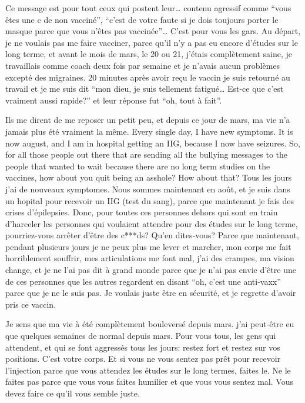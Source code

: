 Ce message est pour tout ceux qui postent leur… contenu agressif comme “vous
êtes une c de non vacciné”, “c'est de votre faute si je dois toujours porter le
masque parce que vous n'êtes pas vaccinée”… C'est pour vous les gars. Au départ,
je ne voulais pas me faire vacciner, parce qu'il n'y a pas eu encore d'études
sur le long terme, et avant le mois de mars, le 20 ou 21, j'étais complètement
saine, je travaillais comme coach deux fois par semaine et je n'avais aucun
problèmes excepté des migraines. 20 minutes après avoir reçu le vaccin je suis
retourné au travail et je me suis dit “mon dieu, je suis tellement fatigué…
Est-ce que c'est vraiment aussi rapide?” et leur réponse fut “oh, tout à fait”.

Ils me dirent de me reposer un petit peu, et depuis ce jour de mars, ma vie n'a
jamais plus été vraiment la même. Every single day, I have new symptoms. It is
now august, and I am in hospital getting an IIG, because I now have
seizures. So, for all those people out there that are sending all the bullying
messages to the people that wanted to wait because there are no long term
studies on the vaccines, how about you quit being an asshole? How about that?
Tous les jours j'ai de nouveaux symptomes. Nous sommes maintenant en août, et je
suis dans un hopital pour recevoir un IIG (test du sang), parce que maintenant
je fais des crises d'épilepsies. Donc, pour toutes ces personnes dehors qui sont
en train d'harceler les personnes qui voulaient attendre pour des études sur le
long terme, pourriez-vous arrêter d'être des c***ds? Qu'en dites-vous? Parce que
maintenant, pendant plusieurs jours je ne peux plus me lever et marcher, mon
corps me fait horriblement souffrir, mes articulations me font mal, j'ai des
crampes, ma vision change, et je ne l'ai pas dit à grand monde parce que je n'ai
pas envie d'être une de ces personnes que les autres regardent en disant “oh,
c'est une anti-vaxx” parce que je ne le suis pas. Je voulais juste être en
sécurité, et je regrette d'avoir pris ce vaccin.

Je sens que ma vie à été complètement bouleversé depuis mars. j'ai peut-être eu
que quelques semaines de normal depuis mars. Pour vous tous, les gens qui
attendent, et qui se font aggressés tous les jours: restez fort et restez sur
vos positions. C'est votre corps. Et si vous ne vous sentez pas prêt pour
recevoir l'injection parce que vous attendez les études sur le long termes,
faites le. Ne le faites pas parce que vous vous faites humilier et que vous vous
sentez mal. Vous devez faire ce qu'il vous semble juste.

